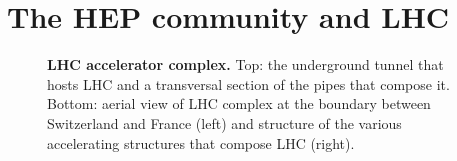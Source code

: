 \section{The HEP community and LHC}
\begin{figure}
    \centering
    
    \caption{\textbf{LHC accelerator complex.} Top: the underground tunnel that hosts LHC and a transversal section of the pipes that compose it. 
    Bottom: aerial view of LHC complex at the boundary between Switzerland and France (left) and structure of the various accelerating structures that compose LHC (right).
    }
    \label{fig:lhc}
\end{figure}

